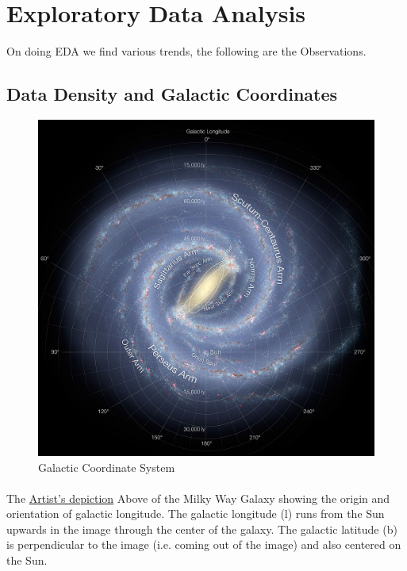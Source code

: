 \documentclass{article}
\begin{document}
\section{Exploratory Data Analysis} On doing EDA we find various trends, the
following are the Observations.\\
\subsection{Data Density and Galactic Coordinates}
\begin{figure}[H]
   \centering
   \label{fig:1}
   \includegraphics[width=\textwidth]{Images/GalacticCoordinates.jpg}
   \caption{Galactic Coordinate System}
\end{figure}

\paragraph{}
The \hyperref[fig:1]{Artist's depiction} Above of the Milky Way Galaxy showing the origin and orientation of galactic longitude. The galactic longitude (l) runs from the Sun upwards in the image through the center of the galaxy. The galactic latitude (b) is perpendicular to the image (i.e. coming out of the image) and also centered on the Sun.
\end{document}
